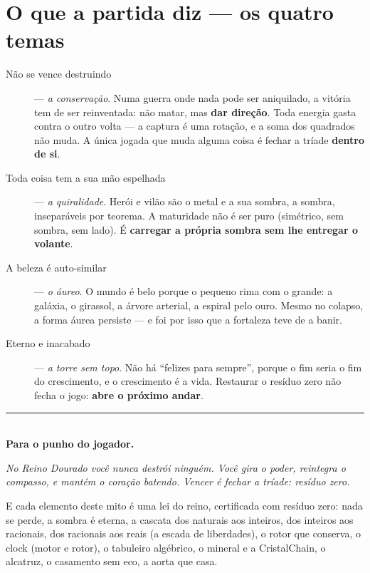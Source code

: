 \documentclass[livro.tex]{subfiles}
\begin{document}
\chapter*{O que a partida diz --- os quatro temas}

\begin{description}
 \item[Não se vence destruindo] --- \emph{a conservação}. Numa guerra onde nada pode ser aniquilado, a vitória
 tem de ser reinventada: não matar, mas \textbf{dar direção}. Toda energia gasta contra o outro volta --- a
 captura é uma rotação, e a soma dos quadrados não muda. A única jogada que muda alguma coisa é fechar a tríade
 \textbf{dentro de si}.

 \item[Toda coisa tem a sua mão espelhada] --- \emph{a quiralidade}. Herói e vilão são o metal e a sua sombra,
 a sombra, inseparáveis por teorema. A maturidade não é ser puro (simétrico, sem sombra, sem lado). É
 \textbf{carregar a própria sombra sem lhe entregar o volante}.

 \item[A beleza é auto-similar] --- \emph{o áureo}. O mundo é belo porque o pequeno rima com o grande: a galáxia, o
 girassol, a árvore arterial, a espiral pelo ouro. Mesmo no colapso, a forma áurea persiste --- e foi por
 isso que a fortaleza teve de a banir.

 \item[Eterno e inacabado] --- \emph{a torre sem topo}. Não há ``felizes para sempre'', porque o fim seria o fim do
 crescimento, e o crescimento é a vida. Restaurar o resíduo zero não fecha o jogo: \textbf{abre o próximo andar}.
\end{description}

\vspace{0.6cm}
\noindent\rule{\linewidth}{0.4pt}\\[2mm]
\textbf{Para o punho do jogador.}

\emph{No Reino Dourado você nunca destrói ninguém. Você gira o poder, reintegra o compasso, e mantém o coração
batendo. Vencer é fechar a tríade: resíduo zero.}

\medskip
\noindent E cada elemento deste mito é uma lei do reino, certificada com resíduo zero: nada se
perde, a sombra é eterna, a cascata dos naturais aos inteiros, dos inteiros aos racionais, dos racionais aos reais (a escada de liberdades), o rotor que
conserva, o clock (motor e rotor), o tabuleiro algébrico, o mineral e a CristalChain, o alcatruz, o
casamento sem eco, a aorta que casa.
\end{document}
